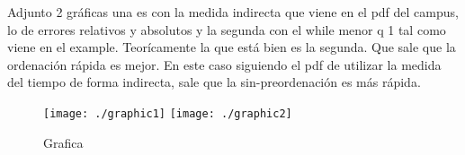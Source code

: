 Adjunto 2 gráficas una es con la medida indirecta que viene en el pdf del campus, lo de errores relativos y absolutos y la segunda con el while  menor q 1 tal como viene en el example. Teorícamente la que está bien es la segunda. Que sale que la ordenación rápida es mejor. En este caso siguiendo el pdf de utilizar la medida del tiempo de forma indirecta, sale que la sin-preordenación es más rápida.

\begin{figure}
\centering
\texttt{[image: ./graphic1]}
\texttt{[image: ./graphic2]}
\caption{Grafica}
\label{fig:Figura}
\end{figure}
